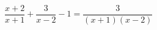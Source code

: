 \begin{ex}[type=equation]
	\begin{condition}
		$\dfrac{x + 2}{x + 1} + \dfrac{3}{x - 2} - 1 = \dfrac{3}{(x+1)(x - 2)}$
	\end{condition}
\end{ex}